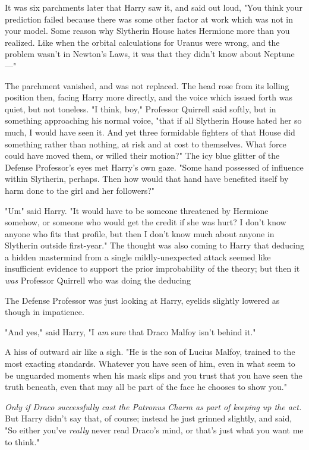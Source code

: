 It was six parchments later that Harry saw it, and said out loud, "You think
your prediction failed because there was some other factor at work which was
not in your model. Some reason why Slytherin House hates Hermione more than you
realized. Like when the orbital calculations for Uranus were wrong, and the
problem wasn't in Newton's Laws, it was that they didn't know about Neptune\mbox{---}"

The parchment vanished, and was not replaced. The head rose from its lolling
position then, facing Harry more directly, and the voice which issued forth was
quiet, but not toneless. "I think, boy," Professor Quirrell said softly, but in
something approaching his normal voice, "that if all Slytherin House hated her
so much, I would have seen it. And yet three formidable fighters of that House
did something rather than nothing, at risk and at cost to themselves. What
force could have moved them, or willed their motion?" The icy blue glitter of
the Defense Professor's eyes met Harry's own gaze. "Some hand possessed of
influence within Slytherin, perhaps. Then how would that hand have benefited
itself by harm done to the girl and her followers?"

"Um{\el}" said Harry. "It would have to be someone threatened by Hermione
somehow, or someone who would get the credit if she was hurt? I don't know
anyone who fits that profile, but then I don't know much about anyone in
Slytherin outside first-year." The thought was also coming to Harry that
deducing a hidden mastermind from a single mildly-unexpected attack seemed like
insufficient evidence to support the prior improbability of the theory; but
then it \emph{was} Professor Quirrell who was doing the deducing{\el}

The Defense Professor was just looking at Harry, eyelids slightly lowered as
though in impatience.

"And yes," said Harry, "I \emph{am} sure that Draco Malfoy isn't behind it."

A hiss of outward air like a sigh. "He is the son of Lucius Malfoy, trained to
the most exacting standards. Whatever you have seen of him, even in what seem
to be unguarded moments when his mask slips and you trust that you have seen
the truth beneath, even that may all be part of the face he chooses to show
you."

\emph{Only if Draco successfully cast the Patronus Charm as part of keeping up
the act.} But Harry didn't say that, of course; instead he just grinned
slightly, and said, "So either you've \emph{really} never read Draco's mind, or
that's just what you want me to think."


